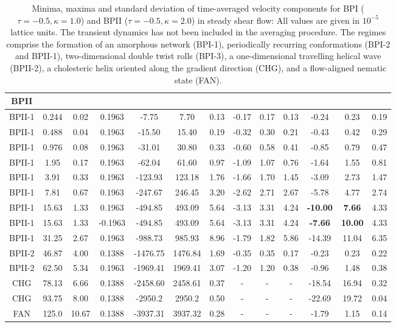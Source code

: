 \documentclass[aps,pre,reprint,superscriptaddress, twocolumn]{revtex4}
\begin{document}
\begin{table}[htpb]
\begin{tabular}{|c||c|| c || c || c |c |c||c| c| c||c| c| c|}
BPII \\
\hline
BPII-1 & 0.244 &0.02 & 0.1963 &-7.75 &7.70 &0.13 &-0.17 &0.17 &0.13 &-0.24 &0.23 &0.19 \\
BPII-1 & 0.488 &0.04 & 0.1963 &-15.50 &15.40 &0.19 &-0.32 &0.30 &0.21 &-0.43 &0.42 &0.29 \\
BPII-1 & 0.976 &0.08 & 0.1963 &-31.01 &30.80 &0.33 &-0.60 &0.58 &0.41 &-0.85 &0.79 &0.47 \\
BPII-1 & 1.95 &0.17  & 0.1963 &-62.04  &61.60 & 0.97 & -1.09 &1.07 & 0.76 & -1.64 & 1.55 & 0.81\\
BPII-1 &3.91 & 0.33& 0.1963 &-123.93 &123.18 & 1.76 &-1.66 &1.70 & 1.45 &-3.09& 2.73 &1.47\\
BPII-1 &7.81 &0.67 & 0.1963  &-247.67 &246.45 & 3.20 &-2.62 &2.71 & 2.67 &-5.78 & 4.77 &2.74\\
BPII-1 &15.63 & 1.33& 0.1963 &-494.85 &493.09 & 5.64 &-3.13 &3.31 &4.24 &\bf{-10.00} & \bf{7.66} &4.33\\
BPII-1 & 15.63 & 1.33& -0.1963&-494.85 &493.09 & 5.64 & -3.13 &3.31 &4.24 &\bf{-7.66} & \bf{10.00} &4.33\\
BPII-1 & 31.25 &2.67 & 0.1963 &-988.73 &985.93 &8.96  &-1.79 &1.82 &5.86 &-14.39 & 11.04 &6.35\\
\hline
BPII-2 & 46.87 &4.00 & 0.1388 & -1476.75 & 1476.84 &1.69 &-0.35  &0.35  & 0.17 &-0.23 &0.23  & 0.22\\
BPII-2 & 62.50 & 5.34& 0.1963 & -1969.41  & 1969.41 & 3.07 & -1.20 & 1.20 & 0.38 &-0.96 & 1.48 &0.38 \\
\hline
CHG & 78.13 & 6.66 &  0.1388 &-2458.60 & 2458.61  &0.37 &- &- &- &-18.54 &16.94 &0.32 \\
CHG & 93.75 &8.00 & 0.1388 &-2950.2  &2950.2 &0.50 &- &- &- &-22.69 & 19.72 & 0.04\\
\hline
FAN & 125.0 &10.67 & 0.1388 &-3937.31  & 3937.32 &0.28 &-  &-  &-  &-1.79 &1.15  &0.14 \\
\hline
\end{tabular}
\caption{Minima, maxima and standard deviation of time-averaged velocity components 
for BPI ($\tau=-0.5, \kappa=1.0$) and BPII ($\tau=-0.5, \kappa=2.0$) in steady 
shear flow: All values are given in $10^{-5}$ lattice units. The transient dynamics 
has not been included in the averaging procedure. The regimes comprise the formation
of an amorphous network (BPI-1), periodically recurring conformations (BPI-2 and BPII-1), 
two-dimensional double twist rolls (BPI-3), a one-dimensional travelling helical wave (BPII-2), 
a cholesteric helix oriented along the gradient direction (CHG), 
and a flow-aligned nematic state (FAN).}
\label{tab1}
\end{table}
\end{document}
